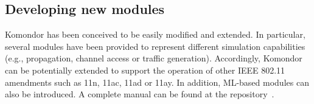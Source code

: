 \documentclass[conference]{IEEEtran}
\newcommand{\sergio}[1]{\textcolor{brown}{#1}}
\begin{document}
	
	\subsection{Developing new modules}
	
	Komondor has been conceived to be easily modified and extended. In particular, several modules have been provided to represent different simulation capabilities (e.g., propagation, channel access or traffic generation). Accordingly, Komondor can be potentially extended to support the operation of other IEEE 802.11 amendments such as 11n, 11ac, 11ad or 11ay. In addition, ML-based modules can also be introduced. A complete manual can be found at the repository~\cite{komondor_manual2018}.
	
\end{document}
